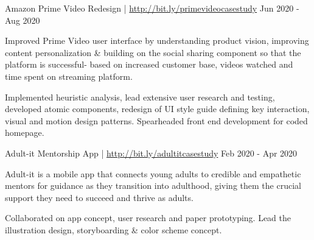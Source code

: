 

\begin{cventries2}

  \cventrymini
    {Amazon Prime Video Redesign | \footnotesize \textnormal{\href{http://bit.ly/primevideocasestudy}{http://bit.ly/primevideocasestudy}}} %
    {Jun 2020 - Aug 2020} %
    {
      \begin{cvitems} 
        \item {Improved Prime Video user interface by understanding product vision, improving content personalization \& building on the social sharing component so that the platform is successful- based on increased customer base, videos watched and time spent on streaming platform.}
        \item{Implemented heuristic analysis, lead extensive user research and testing, developed atomic components, redesign of UI style guide defining key interaction, visual and motion design patterns. Spearheaded front end development for coded homepage.}
      \end{cvitems}
    } %
\cventrymini
{Adult-it Mentorship App | \footnotesize \textnormal{\href{http://bit.ly/adultitcasestudy}{http://bit.ly/adultitcasestudy}}} %
{Feb 2020 - Apr 2020} %
{
	\begin{cvitems} 
		\item {Adult-it is a mobile app that connects young adults to credible and empathetic mentors for guidance as they transition into adulthood, giving them the crucial support they need to succeed and thrive as adults.}
		\item{Collaborated on app concept, user research and paper prototyping. Lead the illustration design, storyboarding \& color scheme concept.}
	\end{cvitems}
} %


\end{cventries2}
